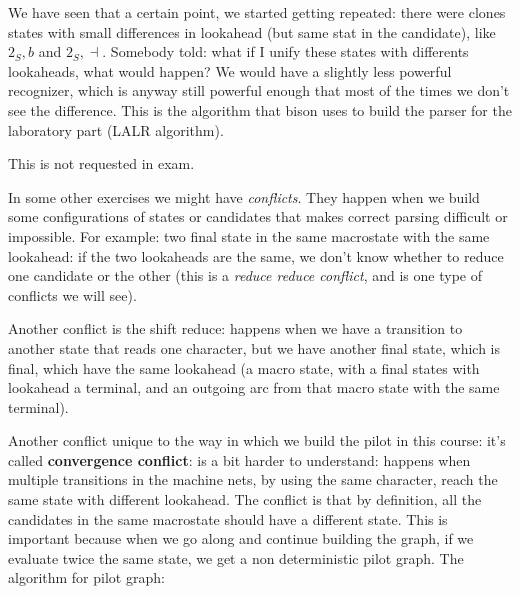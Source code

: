 			We have seen that a certain point, we started getting repeated: there were clones states with small differences in lookahead (but same stat in the 
			candidate), like $2_S,b$ and $2_S,\dashv$. Somebody told: what if I unify these states with differents lookaheads, what would happen? We would have a slightly less
			powerful recognizer, which is anyway still powerful enough that most of the times we don't see the difference. This is the algorithm that bison uses to 
			build the parser for the laboratory part (LALR algorithm).

			This is not requested in exam.

			In some other exercises we might have \emph{conflicts}. They happen when we build some configurations of states or candidates that makes 
			correct parsing difficult or impossible. For example: two final state in the same macrostate with the same lookahead: if the two lookaheads are the 
			same, we don't know whether to reduce one candidate or the other (this is a \emph{reduce reduce conflict}, and is one type of conflicts we will see).

			Another conflict is the shift reduce: happens when we have a transition to another state that reads one character, but we have another final state, which is final, which have the same 
			lookahead (a macro state, with a final states with lookahead a terminal, and an outgoing arc from that macro state with the same terminal).

			Another conflict unique to the way in which we build the pilot in this course: it's called \textbf{convergence conflict}: is a bit harder to understand:  happens when 
			multiple transitions in the machine nets, by using the same character, reach the same state with different lookahead.
			The conflict is that by definition, all the candidates in the same macrostate should have a different state. This is important because when we go along and continue building 
			the graph, if we evaluate twice the same state, we get a non deterministic pilot graph.
			The algorithm for pilot graph:

